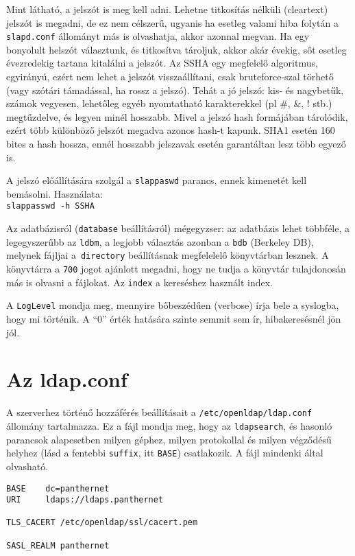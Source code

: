 Mint látható, a jelszót is meg kell adni. Lehetne titkosítás nélküli (cleartext) jelszót is megadni, de ez nem
célszerű, ugyanis ha esetleg valami hiba folytán a \texttt{slapd.conf} állományt más is olvashatja, akkor azonnal
megvan. Ha egy bonyolult helszót választunk, és titkosítva tároljuk, akkor akár évekig, sőt esetleg évezredekig
tartana kitalálni a jelszót. Az SSHA egy megfelelő algoritmus, egyirányú, ezért
nem lehet a jelszót visszaállítani, csak bruteforce-szal törhető (vagy szótári támadással, ha rossz a jelszó). Tehát a
jó jelszó: kis-  és nagybetűk, számok vegyesen, lehetőleg egyéb nyomtatható karakterekkel (pl \#, \&, ! stb.)
megtűzdelve, és legyen minél hosszabb. Mivel a jelszó hash formájában tárolódik, ezért több különböző jelszót megadva
azonos hash-t kapunk. SHA1 esetén 160 bites a hash hossza, ennél hosszabb jelszavak esetén garantáltan lesz több
egyező is.


A jelszó előállítására szolgál a \texttt{slappaswd} parancs, ennek kimenetét kell bemásolni. Használata:\\
\texttt{slappasswd -h {SSHA}}


Az adatbázisról (\texttt{database} beállításról) mégegyzser: az adatbázis lehet többféle, a legegyszerűbb az
\texttt{ldbm}, a legjobb választás azonban a  \texttt{bdb} (Berkeley DB), melynek fájljai a~\texttt{directory}
beállításnak megfelelelő könyvtárban lesznek. A könyvtárra a \texttt{700} jogot ajánlott megadni, hogy ne tudja a
könyvtár tulajdonosán más is olvasni a fájlokat. Az  \texttt{index} a  kereséshez használt index.

A \texttt{LogLevel} mondja meg, mennyire bőbeszédűen (verbose) írja bele a syslogba, hogy mi történik. A ``0'' érték
hatására szinte semmit sem ír, hibakeresésnél jön jól.

\section{Az ldap.conf}
A szerverhez történő hozzáférés beállításait a \texttt{/etc/openldap/ldap.conf} állomány tartalmazza.
Ez a fájl mondja meg, hogy az \texttt{ldapsearch}, és hasonló parancsok alapesetben milyen géphez, milyen protokollal
és milyen végződésű helyhez (lásd a fentebbi \texttt{suffix}, itt \texttt{BASE}) csatlakozik. A fájl mindenki által
olvasható.

\begin{Verbatim}[frame=single,label=ldap.conf]
BASE    dc=panthernet
URI     ldaps://ldaps.panthernet

TLS_CACERT /etc/openldap/ssl/cacert.pem

SASL_REALM panthernet
\end{Verbatim}


